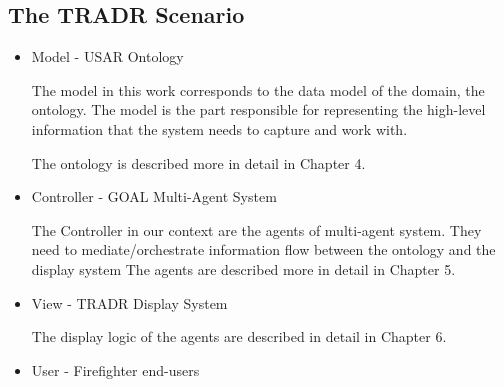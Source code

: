 \subsection{The TRADR Scenario}
\begin{itemize}
\item Model - USAR Ontology

The model in this work corresponds to the data model of the domain, the ontology. The model is the part responsible for representing the high-level information that the system needs to capture and work with.  

The ontology is described more in detail in Chapter 4. 

\item Controller - GOAL Multi-Agent System

The Controller in our context are the agents of multi-agent system. They need to mediate/orchestrate information flow between the ontology and the display system
The agents are described more in detail in Chapter 5.

\item View - TRADR Display System


The display logic of the agents are described in detail in Chapter 6.

\item User - Firefighter end-users



\end{itemize}

  